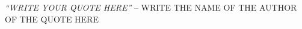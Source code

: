 \pagestyle{empty}

\null\vfill

\begin{center}
\emph{``WRITE YOUR QUOTE HERE''} -- WRITE THE NAME OF THE AUTHOR OF THE QUOTE HERE
\end{center}

\vspace{10cm}

\clearpage